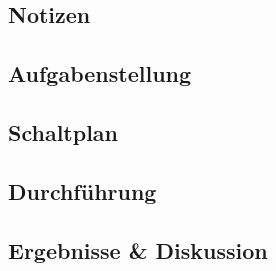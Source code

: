 \documentclass[12pt,a4paper,titlepage]{article}
\begin{document}
\subsection*{Notizen}
%
%
%
%

\subsection*{Aufgabenstellung}


\subsection*{Schaltplan}

\subsection*{Durchf\"uhrung}


\subsection*{Ergebnisse \& Diskussion}
\end{document}
